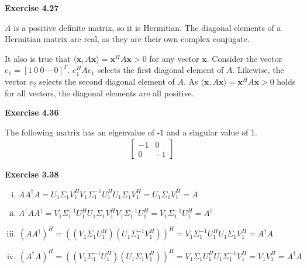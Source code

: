\documentclass[letterpaper,12pt]{article}
\newcommand{\vect}[1]{\mathbf{#1}}
\begin{document}
\textbf{Exercise 4.27}

$A$ is a positive definite matrix, so it is Hermitian. The diagonal elements of a Hermitian matrix are real, as they are their own complex conjugate.

It also is true that $\langle \vect{x},  A\vect{x} \rangle = \vect{x}^H A \vect{x} > 0$ for any vector $\vect{x}$. Consider the vector $e_1 = [1 \ 0 \ 0 \ \cdots \ 0]^T$. $e_1^H A e_1$ selects the first diagonal element of $A$. Likewise, the vector $e_2$ selects the second diagonal element of $A$. As $\langle \vect{x}, A\vect{x} \rangle = \vect{x}^H A \vect{x} > 0$ holds for all vectors, the diagonal elements are all positive.

\textbf{Exercise 4.36}

The following matrix has an eigenvalue of -1 and a singular value of 1.
\begin{align*}
\begin{bmatrix}
-1 & 0 \\
0 & -1
\end{bmatrix}
\end{align*}

\textbf{Exercise 3.38}

\begin{enumerate}[i)]
	\item $AA^{\dagger}A = U_1 \Sigma_1 V_1^H V_1 \Sigma_1^{-1} U_1^H U_1 \Sigma_1 V_1^H = U_1  \Sigma_1 V_1^H = A $
	\item $A^{\dagger} A A^{\dagger} = V_1 \Sigma_1^{-1} U_1^H U_1 \Sigma_1 V_1^H V_1 \Sigma_1^{-1} U_1^H =  V_1 \Sigma_1^{-1} U_1^H = A^{\dagger}$
	\item $(A A^{\dagger})^H = ((V_1 \Sigma_1 U_1^H) (U_1 \Sigma_1^{-1} V_1^H))^H = V_1 \Sigma_1^{-1} U_1^H U_1 \Sigma_1 V_1^H = A^{\dagger} A$
	\item $(A^{\dagger} A)^H = (( V_1 \Sigma_1^{-1} U_1^H)(U_1 \Sigma_1 V_1^H))^H = V_1 \Sigma_1 U_1^H U_1 \Sigma_1^{-1} V_1^H = V_1 V_1^H = A^{\dagger} A$
\end{enumerate}
\end{document}
